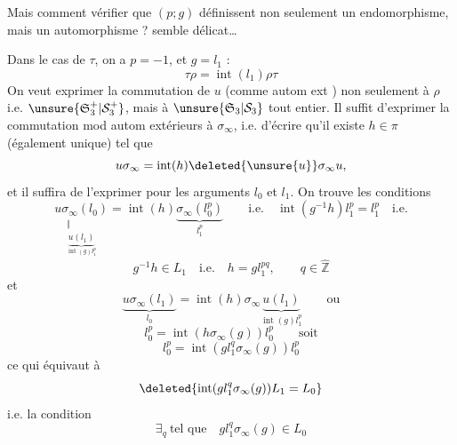 Mais comment vérifier que $(p;g)$ définissent non seulement un endomorphisme, mais un automorphisme ?  semble délicat\ldots

Dans le cas de $\tau$, on a $p=-1$, et $g=l_1$ :
\[
\tau\rho=\operatorname{int}(l_1)\rho\tau
\]
On veut exprimer la commutation de $u$ (comme autom ext ) non seulement à $\rho$ i.e. $\unsure{\mathfrak S_3^+|\mathcal S_3^+}$, mais à $\unsure{\mathfrak S_3|\mathcal S_3}$ tout entier. Il suffit d'exprimer la commutation mod autom extérieurs à $\sigma_\infty$, i.e. d'écrire qu'il existe $h\in\pi$ (également unique) tel que
\[
u\sigma_\infty=\operatorname{int}(h)\deleted{\unsure{u}}\sigma_\infty u,
\]
et il suffira de l'exprimer pour les arguments $l_0$ et $l_1$. On trouve les conditions
\[
\underset{\substack{\Vert\\\underbrace{u(l_1)}_{\operatorname{int}(g)l_1^p}}}{u\sigma_\infty(l_0)}=\operatorname{int}(h)\underbrace{\sigma_\infty(l_0^p)}_{l_1^p}
\qquad\text{i.e.}\quad\operatorname{int}(g^{-1}h)l_1^p=l_1^p\quad\text{i.e.}
\]
\[
g^{-1}h\in L_1\quad\text{i.e.}\quad h=gl_1^{pq},\qquad q\in\hat{\mathbb Z}
\]
et
\[
\underbrace{u\sigma_\infty(l_1)}_{l_0}=\operatorname{int}(h)\sigma_\infty\underbrace{u(l_1)}_{\operatorname{int}(g)l_1^p}\qquad\text{ou}
\]
\[
l_0^p=\operatorname{int}(h\sigma_\infty(g))l_0^p\qquad\text{soit}
\]
\[
l_0^p=\operatorname{int}(gl_1^q\sigma_\infty(g))l_0^p
\]
ce qui équivaut à
\[
\deleted{\operatorname{int}(gl_1^q\sigma_\infty(g))L_1=L_0}
\]
i.e. la condition
\[
\exists_q\ \text{tel que}\quad gl_1^q\sigma_\infty(g)\in L_0
\]
